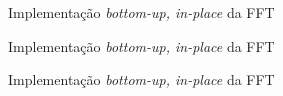 \begin{frame}[fragile]{Implementação {\it bottom-up, in-place} da FFT}
\end{frame}

\begin{frame}[fragile]{Implementação {\it bottom-up, in-place} da FFT}
\end{frame}

\begin{frame}[fragile]{Implementação {\it bottom-up, in-place} da FFT}
\end{frame}
